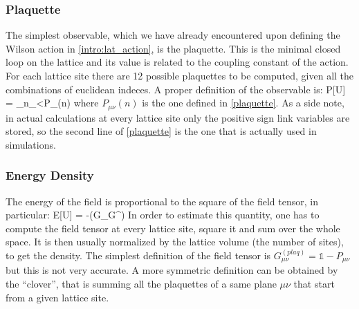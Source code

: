 \subsubsection{Plaquette}
The simplest observable, which we have already encountered upon defining the Wilson action in \ref{intro:lat_action}, is the plaquette. This is the minimal closed loop on the lattice and its value is related to the coupling constant of the action. For each lattice site there are 12 possible plaquettes to be computed, given all the combinations of euclidean indeces. A proper definition of the observable is:
\beq
    P[U] = \sum_{n\in\Lambda}\sum_{\mu<\nu}P_{\mu\nu}(n)
\eeq
where $P_{\mu\nu}(n)$ is the one defined in \cref{plaquette}. As a side note, in actual calculations at every lattice site only the positive sign link variables are stored, so the second line of \ref{plaquette} is the one that is actually used in simulations.

\subsubsection{Energy Density}
The energy of the field is proportional to the square of the field tensor, in particular:
\beq
    E[U] = -\Re\Tr(G_{\mu\nu}G^{\mu\nu})
    \label{eq:energy}
\eeq
In order to estimate this quantity, one has to compute the field tensor at every lattice site, square it and sum over the whole space. It is then usually normalized by the lattice volume (the number of sites), to get the density. The simplest definition of the field tensor is $G_{\mu\nu}^{(plaq)} = \mathds{1} - P_{\mu\nu}$ but this is not very accurate. A more symmetric definition can be obtained by the ``clover'', that is summing all the plaquettes of a same plane $\mu\nu$ that start from a given lattice site. 

